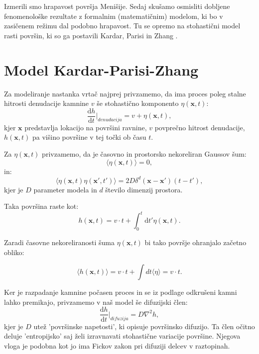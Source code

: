 \documentclass[a4paper, twoside, 12pt]{book}
\begin{document}
Izmerili smo hrapavost površja Menišije. Sedaj skušamo osmisliti dobljene fenomenološke rezultate z formalnim (matematičnim) modelom, ki bo v zasičenem režimu dal podobno hrapavost. Tu se opremo na stohastični model rasti površin, ki so ga postavili Kardar, Parisi in Zhang \cite{kardar1986dynamic}.

    \section{Model Kardar-Parisi-Zhang}

    Za modeliranje nastanka vrtač najprej privzamemo, da ima proces poleg stalne hitrosti denudacije kamnine $v$ še stohastično komponento $\eta(\mathbf{x},t)$:
\begin{equation}
  \frac{\mathrm{d} h}{\mathrm{d} t} \bigg|_{denudacija} = v + \eta(\mathbf{x},t),
\end{equation}
kjer $\mathbf{x}$ predstavlja lokacijo na površini ravnine, $v$ povprečno hitrost denudacije, $h(\mathbf{x},t)$ pa višino površine v tej točki ob času $t$. 

Za $\eta (\mathbf{x},t)$ privzamemo, da je časovno in prostorsko nekoreliran Gaussov šum: 
\begin{equation} 
  \langle \eta(\mathbf{x},t) \rangle=0,
\end{equation}
in:
\begin{equation}
  \langle \eta(\mathbf{x},t) \eta(\mathbf{x'},t')\rangle = 2 D \delta^d(\mathbf{x}-\mathbf{x'})(t-t'),
\end{equation}
kjer je $D$ parameter modela in $d$ število dimenzij prostora.

Taka površina raste kot:
\begin{equation}
  h(\mathbf{x},t) = v \cdot t + \int_0^t \mathrm{d} t' \eta (\mathbf{x},t).
\end{equation}

Zaradi časovne nekoreliranosti šuma $\eta({\mathbf{x},t})$ bi tako površje ohranjalo začetno obliko:

\begin{equation}
  \langle h(\mathbf{x},t) \rangle = v \cdot t + \int dt \langle \eta \rangle = v \cdot t.
\end{equation}

Ker je razpadanje kamnine počasen proces in se iz podlage odkrušeni kamni lahko premikajo, privzamemo v naš model še difuzijski člen:
\begin{equation}
  \frac{\mathrm{d} h}{\mathrm{d} t} \bigg|_{difuzija} = D \nabla^2 h,
\end{equation}
kjer je $D$ utež 'površinske napetosti', ki opisuje površinsko difuzijo. Ta člen očitno deluje 'entropijsko'  saj želi izravnavati stohastične variacije površine. Njegova vloga je podobna kot jo ima Fickov zakon pri difuziji delcev v raztopinah.
\end{document}
